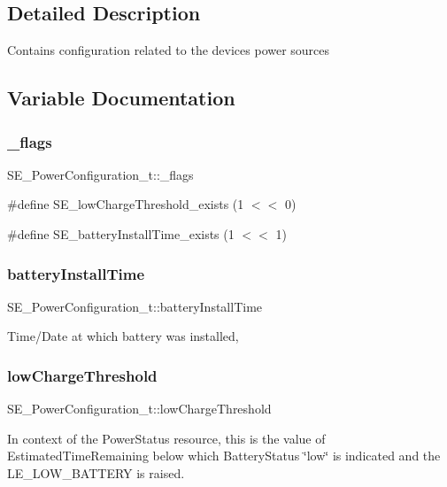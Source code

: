 \subsection{Detailed Description}
Contains configuration related to the device\textquotesingle{}s power sources 

\subsection{Variable Documentation}
\mbox{\label{group__PowerConfiguration_gaffb8f5fe39b37d5db62a169a4add7087}} 
\subsubsection{\texorpdfstring{\+\_\+flags}{\_flags}}
{\footnotesize\ttfamily S\+E\+\_\+\+Power\+Configuration\+\_\+t\+::\+\_\+flags}

\#define S\+E\+\_\+low\+Charge\+Threshold\+\_\+exists (1 $<$$<$ 0)

\#define S\+E\+\_\+battery\+Install\+Time\+\_\+exists (1 $<$$<$ 1) \mbox{\label{group__PowerConfiguration_gabe59076653672547fa38fa99fea40738}} 
\subsubsection{\texorpdfstring{battery\+Install\+Time}{batteryInstallTime}}
{\footnotesize\ttfamily S\+E\+\_\+\+Power\+Configuration\+\_\+t\+::battery\+Install\+Time}

Time/\+Date at which battery was installed, \mbox{\label{group__PowerConfiguration_gaec3de6e5b673fb3fd57c4bcf33491360}} 
\subsubsection{\texorpdfstring{low\+Charge\+Threshold}{lowChargeThreshold}}
{\footnotesize\ttfamily S\+E\+\_\+\+Power\+Configuration\+\_\+t\+::low\+Charge\+Threshold}

In context of the Power\+Status resource, this is the value of Estimated\+Time\+Remaining below which Battery\+Status \char`\"{}low\char`\"{} is indicated and the L\+E\+\_\+\+L\+O\+W\+\_\+\+B\+A\+T\+T\+E\+RY is raised. 